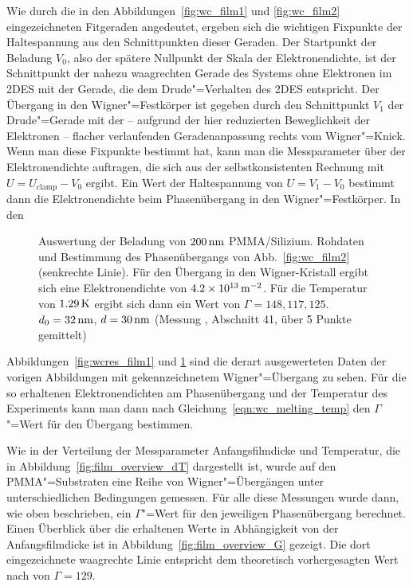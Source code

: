 Wie durch die in den Abbildungen~\ref{fig:wc_film1} und \ref{fig:wc_film2} eingezeichneten Fitgeraden angedeutet, ergeben sich die wichtigen Fixpunkte der Haltespannung aus den Schnittpunkten dieser Geraden. Der Startpunkt der Beladung $V_0$, also der spätere Nullpunkt der Skala der Elektronendichte, ist der Schnittpunkt der nahezu waagrechten Gerade des Systems ohne Elektronen im 2DES mit der Gerade, die dem Drude"=Verhalten des 2DES entspricht. Der Übergang in den Wigner"=Festkörper ist gegeben durch den Schnittpunkt $V_1$ der Drude"=Gerade mit der -- aufgrund der hier reduzierten Beweglichkeit der Elektronen -- flacher verlaufenden Geradenanpassung rechts vom Wigner"=Knick. Wenn man diese Fixpunkte bestimmt hat, kann man die Messparameter über der Elektronendichte auftragen, die sich aus der selbstkonsistenten Rechnung mit $U=U_\text{clamp}-V_0$ ergibt. \enlargethispage{\baselineskip}Ein Wert der Haltespannung von $U=V_1-V_0$ bestimmt dann die Elektronendichte beim Phasenübergang in den Wigner"=Festkörper. In den
\begin{figure}[h!tbp]
    \hfill%
    \begin{minipage}[b]{\textwidth-\midwidth-\tabcolsep}
        \caption[Auswertung Wigner-Übergang auf PMMA]{Auswertung der Beladung von $\unit[200]{nm}$ PMMA/Silizium. Rohdaten und Bestimmung des Phasenübergangs von Abb.~\ref{fig:wc_film2} (senkrechte Linie). Für den Übergang in den Wigner-Kristall ergibt sich eine Elektronendichte von $\unit[4.2\times10^{13}]{\Em}$. Für die Temperatur von $\unit[1.29]{K}$ ergibt sich dann ein Wert von $\Gamma=148, 117, 125$. $d_0=\unit[32]{nm}$, $d=\unit[30]{nm}$ (Messung , Abschnitt 41, über 5 Punkte gemittelt)}
        \label{fig:wcres_film2}
    \end{minipage}
\end{figure}
Abbildungen~\ref{fig:wcres_film1} und \ref{fig:wcres_film2} sind die derart ausgewerteten Daten der vorigen Abbildungen mit gekennzeichnetem Wigner"=Übergang zu sehen. Für die so erhaltenen Elektronendichten am Phasenübergang und der Temperatur des Experiments kann man dann nach Gleichung~\eqref{eqn:wc_melting_temp} den $\Gamma$"=Wert für den Übergang bestimmen.
 
Wie in der Verteilung der Messparameter Anfangsfilmdicke und Temperatur, die in Abbildung~\ref{fig:film_overview_dT} dargestellt ist, wurde auf den PMMA"=Substraten eine Reihe von Wigner"=Übergängen unter unterschiedlichen Bedingungen gemessen. Für alle diese Messungen wurde dann, wie oben beschrieben, ein $\Gamma$"=Wert für den jeweiligen Phasenübergang berechnet. Einen Überblick über die erhaltenen Werte in Abhängigkeit von der Anfangsfilmdicke ist in Abbildung~\ref{fig:film_overview_G} gezeigt. Die dort eingezeichnete waagrechte Linie entspricht dem theoretisch vorhergesagten Wert nach \cite{Mor79} von $\Gamma=129$.

